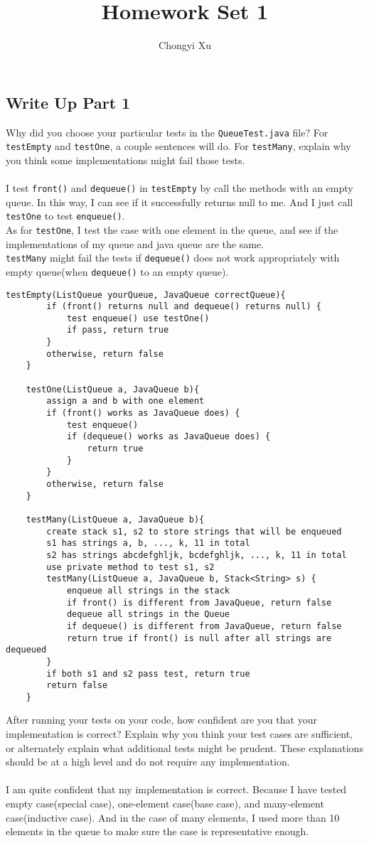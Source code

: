 \documentclass[]{exam}
\title{}
\title{Homework Set 1}
\author{Chongyi Xu}
\begin{document}
	
\maketitle
\begin{questions}
\section*{Write Up Part 1}
	\question Why did you choose your particular tests in the \verb|QueueTest.java| file? For \verb|testEmpty| and \verb|testOne|, a couple sentences will do. For \verb|testMany|, explain why you think some implementations might fail those tests.
	\\
	\\ I test \verb|front()| and \verb|dequeue()| in \verb|testEmpty| by call the methods with an empty queue. In this way, I can see if it successfully returns null to me. And I just call \verb|testOne| to test \verb|enqueue()|.
	\\ As for \verb|testOne|, I test the case with one element in the queue, and see if the implementations of my queue and java queue are the same.
	\\ \verb|testMany| might fail the tests if \verb|dequeue()| does not work appropriately with empty queue(when \verb|dequeue()| to an empty queue).
	\begin{Verbatim}[tabsize=4]
	testEmpty(ListQueue yourQueue, JavaQueue correctQueue){
		if (front() returns null and dequeue() returns null) {
			test enqueue() use testOne()
			if pass, return true
		}
		otherwise, return false
	}

	testOne(ListQueue a, JavaQueue b){
		assign a and b with one element
		if (front() works as JavaQueue does) {
			test enqueue()
			if (dequeue() works as JavaQueue does) {
				return true
			}
		}	
		otherwise, return false
	}

	testMany(ListQueue a, JavaQueue b){
		create stack s1, s2 to store strings that will be enqueued
		s1 has strings a, b, ..., k, 11 in total
		s2 has strings abcdefghljk, bcdefghljk, ..., k, 11 in total
		use private method to test s1, s2 
		testMany(ListQueue a, JavaQueue b, Stack<String> s) {
			enqueue all strings in the stack
			if front() is different from JavaQueue, return false
			dequeue all strings in the Queue
			if dequeue() is different from JavaQueue, return false
			return true if front() is null after all strings are dequeued 
		}
		if both s1 and s2 pass test, return true
		return false
	}
	\end{Verbatim}

	\question After running your tests on your code, how confident are you that your implementation is correct? Explain why you think your test cases are sufficient, or alternately explain what additional tests might be prudent. These explanations should be at a high level and do not require any implementation.
	\\ 
	\\ I am quite confident that my implementation is correct. Because I have tested empty case(special case), one-element case(base case), and many-element case(inductive case). And in the case of many elements, I used more than 10 elements in the queue to make sure the case is representative enough.
\end{questions}
\end{document}

